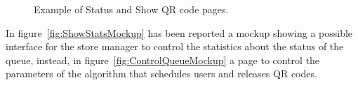 \begin{figure}[H]
    \centering     %
    \caption{Example of Status and Show QR code pages.}
\end{figure}

In figure~\ref{fig:ShowStatsMockup} has been reported a mockup showing a possible interface for the store manager to control the statistics about the status of the queue, instead,
in figure~\ref{fig:ControlQueueMockup} a page to control the parameters of the algorithm that schedules users and releases QR codes.


